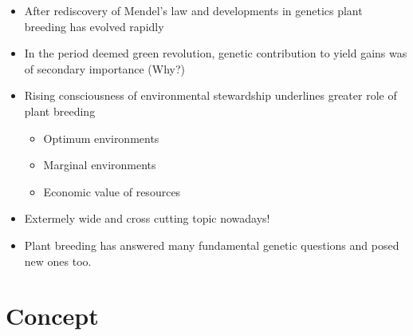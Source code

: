 \documentclass[11pt,ignorenonframetext,aspectratio=169]{beamer}
\providecommand{\tightlist}{%
  \setlength{\itemsep}{0pt}\setlength{\parskip}{0pt}}
\begin{document}
\begin{frame}{}
\protect\hypertarget{section-2}{}
\begin{itemize}
\tightlist
\item
  After rediscovery of Mendel's law and developments in genetics plant
  breeding has evolved rapidly
\item
  In the period deemed green revolution, genetic contribution to yield
  gains was of secondary importance (Why?)
\item
  Rising consciousness of environmental stewardship underlines greater
  role of plant breeding

  \begin{itemize}
  \tightlist
  \item
    Optimum environments
  \item
    Marginal environments
  \item
    Economic value of resources
  \end{itemize}
\item
  Extermely wide and cross cutting topic nowadays!
\item
  Plant breeding has answered many fundamental genetic questions and
  posed new ones too.
\end{itemize}
\end{frame}

\hypertarget{concept}{%
\section{Concept}\label{concept}}
\end{document}
